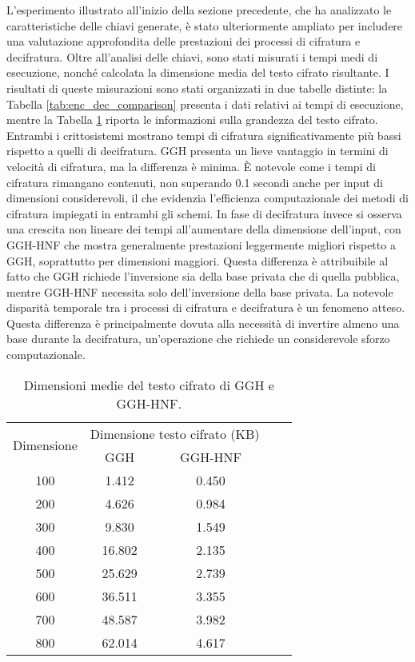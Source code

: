 L'esperimento illustrato all'inizio della sezione precedente, che ha analizzato le 
caratteristiche delle chiavi generate, è stato ulteriormente ampliato per includere una 
valutazione approfondita delle prestazioni dei processi di cifratura e decifratura. 
Oltre all'analisi delle chiavi, sono stati misurati i tempi medi di esecuzione, 
nonché calcolata la dimensione media del testo cifrato risultante. 
I risultati di queste misurazioni sono stati organizzati in due 
tabelle distinte: la Tabella \ref{tab:enc_dec_comparison} presenta i dati relativi ai 
tempi di esecuzione, mentre la Tabella \ref{tab:ciphertext_size_comparison} riporta le 
informazioni sulla grandezza del testo cifrato. 
Entrambi i crittosistemi mostrano tempi di cifratura significativamente più bassi rispetto
a quelli di decifratura. GGH presenta un lieve vantaggio in termini di velocità di 
cifratura, ma la differenza è minima. È notevole come i tempi di cifratura rimangano 
contenuti, non superando 0.1 secondi anche per input di dimensioni considerevoli, il 
che evidenzia l'efficienza computazionale dei metodi di cifratura impiegati in entrambi gli schemi.
In fase di decifratura invece si osserva una crescita non lineare dei tempi all'aumentare 
della dimensione dell'input, con GGH-HNF che mostra generalmente prestazioni leggermente 
migliori rispetto a GGH, soprattutto per dimensioni maggiori. 
Questa differenza è attribuibile al fatto che GGH richiede l'inversione sia della base privata 
che di quella pubblica, mentre GGH-HNF necessita solo dell'inversione della base privata.
La notevole disparità temporale tra i processi di cifratura e decifratura è un fenomeno atteso. 
Questa differenza è principalmente dovuta alla necessità di invertire almeno una base durante 
la decifratura, un'operazione che richiede un considerevole sforzo computazionale. 

\begin{table}[htbp]
    \centering
    \begin{tabular}{|c|c|c|c|c|}
        \hline
        \multirow{2}{*}{Dimensione} & 
        \multicolumn{2}{c|}{Dimensione testo cifrato (KB)} \\
        \cline{2-3}
        & GGH & GGH-HNF\\
        \hline
        100 & 1.412  & 0.450  \\ 
        200 & 4.626  & 0.984  \\
        300 & 9.830  & 1.549  \\
        400 & 16.802 & 2.135 \\
        500 & 25.629 & 2.739  \\
        600 & 36.511 & 3.355  \\
        700 & 48.587 & 3.982  \\
        800 & 62.014 & 4.617  \\
        \hline
    \end{tabular}
    \caption{Dimensioni medie del testo cifrato di GGH e GGH-HNF.}
    \label{tab:ciphertext_size_comparison}
\end{table}

